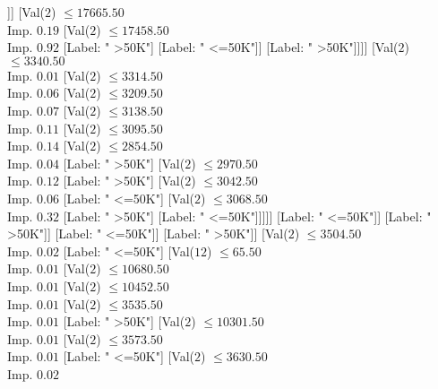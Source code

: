 \documentclass[margin=10pt]{standalone}
\begin{document}
\begin{forest}
									[Val($2$) $ \leq 16504.50$ \\ Imp. $0.38$
										[Val($2$) $ \leq 15966.50$ \\ Imp. $0.20$
											[Label: " <=50K"]
											[Val($2$) $ \leq 16043.50$ \\ Imp. $0.92$
												[Label: " >50K"]
												[Label: " <=50K"]]]
										[Val($2$) $ \leq 17665.50$ \\ Imp. $0.19$
											[Val($2$) $ \leq 17458.50$ \\ Imp. $0.92$
												[Label: " >50K"]
												[Label: " <=50K"]]
											[Label: " >50K"]]]]
								[Val($2$) $ \leq 3340.50$ \\ Imp. $0.01$
									[Val($2$) $ \leq 3314.50$ \\ Imp. $0.06$
										[Val($2$) $ \leq 3209.50$ \\ Imp. $0.07$
											[Val($2$) $ \leq 3138.50$ \\ Imp. $0.11$
												[Val($2$) $ \leq 3095.50$ \\ Imp. $0.14$
													[Val($2$) $ \leq 2854.50$ \\ Imp. $0.04$
														[Label: " >50K"]
														[Val($2$) $ \leq 2970.50$ \\ Imp. $0.12$
															[Label: " >50K"]
															[Val($2$) $ \leq 3042.50$ \\ Imp. $0.06$
																[Label: " <=50K"]
																[Val($2$) $ \leq 3068.50$ \\ Imp. $0.32$
																	[Label: " >50K"]
																	[Label: " <=50K"]]]]]
													[Label: " <=50K"]]
												[Label: " >50K"]]
											[Label: " <=50K"]]
										[Label: " >50K"]]
									[Val($2$) $ \leq 3504.50$ \\ Imp. $0.02$
										[Label: " <=50K"]
										[Val($12$) $ \leq 65.50$ \\ Imp. $0.01$
											[Val($2$) $ \leq 10680.50$ \\ Imp. $0.01$
												[Val($2$) $ \leq 10452.50$ \\ Imp. $0.01$
													[Val($2$) $ \leq 3535.50$ \\ Imp. $0.01$
														[Label: " >50K"]
														[Val($2$) $ \leq 10301.50$ \\ Imp. $0.01$
															[Val($2$) $ \leq 3573.50$ \\ Imp. $0.01$
																[Label: " <=50K"]
																[Val($2$) $ \leq 3630.50$ \\ Imp. $0.02$

\end{forest}
\end{document}
